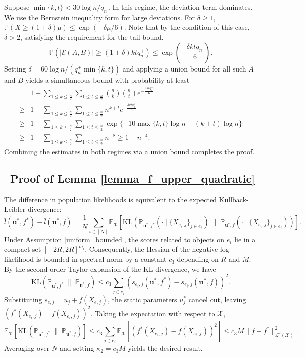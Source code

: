 \documentclass[
  12pt]{article}
\begin{document}
\noindent Suppose $\min \{k, t\} < 30 \log n/q_{n}^{+}$. In this regime, the deviation term dominates. We use the Bernstein inequality form for large deviations. For $\delta \geq 1$, $\mathbb{P}(X \geq (1+\delta)\mu) \leq \exp\left(-{\delta \mu}/{6}\right)$. Note that by the condition of this case, $\delta > 2$, satisfying the requirement for the tail bound. 
$$
\mathbb{P}\left(|\mathcal{E}(A, B)| \geq (1+\delta) k t q_{n}^{+}\right) \leq \exp\left(-\frac{\delta k t q_{n}^{+}}{6}\right).
$$
Setting $\delta = {60 \log n}/{(q_{n}^{+} \min \{k, t\})}$  and applying a union bound for all such $A$ and $B$ yields a simultaneous bound with probability at least
$$
\begin{aligned}
& 1-\sum_{1 \leq k \leq \frac{n}{2}} \sum_{1 \leq t \leq \frac{n}{2}} \binom{n}{k}\binom{n}{t} e^{-\frac{\delta k t q_{n}^{+}}{6}} \\
\geq & 1-\sum_{1 \leq k \leq \frac{n}{2}} \sum_{1 \leq t \leq \frac{n}{2}} n^{k+t} e^{-\frac{\delta k t q_{n}^{+}}{6}} \\
\geq & 1-\sum_{1 \leq k \leq \frac{n}{2}} \sum_{1 \leq t \leq \frac{n}{2}} \exp \{-10 \max \{k, t\} \log n+(k+t) \log n\} \\
\geq & 1-\sum_{1 \leq k \leq \frac{n}{2}} \sum_{1 \leq t \leq \frac{n}{2}} n^{-8} \geq  1-n^{-4} .
\end{aligned}
$$
Combining the estimates in both regimes via a union bound completes the proof.

\subsection{~Proof of Lemma \ref{lemma_f_upper_quadratic}}
The difference in population likelihoods is equivalent to the expected Kullback-Leibler divergence:
$$
\bar{l}(\boldsymbol{u}^*, f^*) - \bar{l}(\boldsymbol{u}^*, f) = \frac{1}{N} \sum_{i \in [N]} \mathbb{E}_{\mathcal{X}} \left[ \text{KL}\left( \mathbb{P}_{\boldsymbol{u}^*, f^*} \left( \cdot \mid \{X_{e_i, j}\}_{j \in e_i} \right) \; \Big\| \; \mathbb{P}_{\boldsymbol{u}^*, f} \left( \cdot \mid \{X_{e_i, j}\}_{j \in e_i} \right) \right) \right].
$$
Under Assumption \ref{uniform_bounded}, the  scores  related to objects on $e_i$ lie in a compact set $[-2R, 2R]^{m_i}$. Consequently, the Hessian of the negative log-likelihood is bounded in spectral norm by a constant $c_3$ depending on $R$ and $M$. By the second-order Taylor expansion of the KL divergence, we have
$$
\text{KL}\left( \mathbb{P}_{\boldsymbol{u}^*, f^*} \; \Big\| \; \mathbb{P}_{\boldsymbol{u}^*, f} \right) \leq c_3 \sum_{j \in e_i} \left( s_{e_i, j}(\boldsymbol{u}^*, f^*) - s_{e_i, j}(\boldsymbol{u}^*, f) \right)^2.
$$
Substituting $s_{e,j} = u_j + f(X_{e,j})$, the static parameters $u^*_j$ cancel out, leaving $(f^*(X_{e_i, j}) - f(X_{e_i, j}))^2$. Taking the expectation with respect to $\mathcal{X}$,
$$
\mathbb{E}_{\mathcal{X}} \left[\text{KL}\left( \mathbb{P}_{\boldsymbol{u}^*, f^*} \; \Big\| \; \mathbb{P}_{\boldsymbol{u}^*, f} \right) \right] \leq c_3 \sum_{j \in e_i} \mathbb{E}_{\mathcal{X}} \left[ \left( f^*(X_{e_i, j}) - f(X_{e_i, j}) \right)^2 \right] \leq c_3 M \| f - f^* \|_{\mathcal{L}^2(\mathcal{X})}^2.
$$
Averaging over $N$ and setting $\kappa_2 = c_3 M$ yields the desired result.
\end{document}

